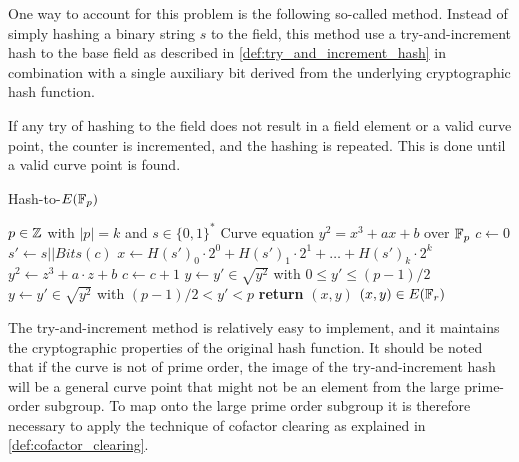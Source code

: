 One way to account for this problem is the following so-called  method. Instead of simply hashing a binary string $s$ to the field, this method use a try-and-increment hash to the base field as described in \ref{def:try_and_increment_hash} in combination with a single auxiliary bit derived from the underlying cryptographic hash function.

If any try of hashing to the field does not result in a field element or a valid curve point, the counter is incremented, and the hashing is repeated. This is done until a valid curve point is found. 

\begin{algorithm}\caption{Hash-to-$E(\mathbb{F}_p)$}
\begin{algorithmic}[0]
\Require $p \in \mathbb{Z}$ with $|p|=k$ and $s\in\{0,1\}^*$
\Require Curve equation $y^2 = x^3 + ax +b$ over $\mathbb{F}_p$
\State $c \gets 0$	
\Repeat
\State $s' \gets s||Bits(c)$
\State $x \gets H(s')_0\cdot 2^0 + H(s')_1\cdot 2^1 + \ldots + H(s')_{k}\cdot 2^{k}$ 
\State $y^2 \gets z^3 + a\cdot z + b$ 
\State $c\gets c+1$
 
 
\State $y \gets y'\in \sqrt{y^2}$ with $0\leq y' \leq (p-1)/2$
\Else 
\State $y \gets y'\in \sqrt{y^2}$ with $(p-1)/2 < y' < p$
\EndIf
\State \textbf{return} $(x,y)$
\EndProcedure
\Ensure $(x,y)\in E(\mathbb{F}_r)$
\end{algorithmic}
\end{algorithm}

The try-and-increment method is relatively easy to implement, and it maintains the cryptographic properties of the original hash function. It should be noted that if the curve is not of prime order, the image of the try-and-increment hash will be a general curve point that might not be an element from the large prime-order subgroup. To map onto the large prime order subgroup it is therefore necessary to apply the technique of cofactor clearing as explained in \ref{def:cofactor_clearing}.

